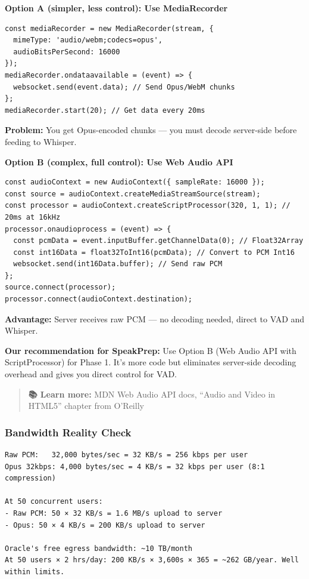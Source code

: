 \documentclass[
  11pt,
]{article}
\begin{document}
\textbf{Option A (simpler, less control): Use MediaRecorder}

\begin{lstlisting}
const mediaRecorder = new MediaRecorder(stream, {
  mimeType: 'audio/webm;codecs=opus',
  audioBitsPerSecond: 16000
});
mediaRecorder.ondataavailable = (event) => {
  websocket.send(event.data); // Send Opus/WebM chunks
};
mediaRecorder.start(20); // Get data every 20ms
\end{lstlisting}

\textbf{Problem:} You get Opus-encoded chunks --- you must decode
server-side before feeding to Whisper.

\textbf{Option B (complex, full control): Use Web Audio API}

\begin{lstlisting}
const audioContext = new AudioContext({ sampleRate: 16000 });
const source = audioContext.createMediaStreamSource(stream);
const processor = audioContext.createScriptProcessor(320, 1, 1); // 20ms at 16kHz
processor.onaudioprocess = (event) => {
  const pcmData = event.inputBuffer.getChannelData(0); // Float32Array
  const int16Data = float32ToInt16(pcmData); // Convert to PCM Int16
  websocket.send(int16Data.buffer); // Send raw PCM
};
source.connect(processor);
processor.connect(audioContext.destination);
\end{lstlisting}

\textbf{Advantage:} Server receives raw PCM --- no decoding needed,
direct to VAD and Whisper.

\textbf{Our recommendation for SpeakPrep:} Use Option B (Web Audio API
with ScriptProcessor) for Phase 1. It's more code but eliminates
server-side decoding overhead and gives you direct control for VAD.

\begin{quote}
\textbf{📚 Learn more:} MDN Web Audio API docs, ``Audio and Video in
HTML5'' chapter from O'Reilly
\end{quote}

\hypertarget{bandwidth-reality-check}{%
\subsubsection{Bandwidth Reality Check}\label{bandwidth-reality-check}}

\begin{lstlisting}
Raw PCM:   32,000 bytes/sec = 32 KB/s = 256 kbps per user
Opus 32kbps: 4,000 bytes/sec = 4 KB/s = 32 kbps per user (8:1 compression)

At 50 concurrent users:
- Raw PCM: 50 × 32 KB/s = 1.6 MB/s upload to server
- Opus: 50 × 4 KB/s = 200 KB/s upload to server

Oracle's free egress bandwidth: ~10 TB/month
At 50 users × 2 hrs/day: 200 KB/s × 3,600s × 365 = ~262 GB/year. Well within limits.
\end{lstlisting}
\end{document}
